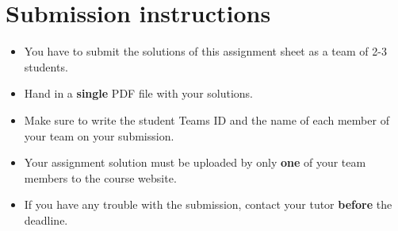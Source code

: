 \section*{Submission instructions}


\begin{itemize}
    \item You have to submit the solutions of this assignment sheet as a team of 2-3 students.
    \item  Hand in a \textbf{single} PDF file with your solutions.
    \item Make sure to write the student Teams ID and the name of each
    member of your team on your submission.
    \item Your assignment solution must be uploaded by only \textbf{one} of your team members to the course website.
    \item If you have any trouble with the submission, contact your tutor \textbf{before} the deadline.
\end{itemize}


